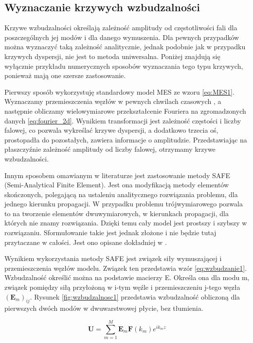 

\subsection{Wyznaczanie krzywych wzbudzalności}

Krzywe wzbudzalności określają zależność amplitudy od częstotliwości fali dla poszczególnych jej modów i dla danego wymuszenia. Dla pewnych przypadków można wyznaczyć taką zależność analitycznie, jednak podobnie jak w przypadku krzywych dyspersji, nie jest to metoda uniwersalna. Poniżej znajdują się wyłącznie przykładu numerycznych sposobów wyznaczania tego typu krzywych, ponieważ mają one szersze zastosowanie.

Pierwszy sposób wykorzystuję standardowy model MES ze wzoru \ref{eq:MES1}. Wyznaczamy przemieszczenia węzłów w pewnych chwilach czasowych , a następnie obliczamy wielowymiarowe przekształcenie Fouriera na zgromadzonych danych \ref{eq:fourier_2d}. Wynikiem transformacji jest zależność częstości i liczby falowej, co pozwala wykreślać krzywe dyspersji, a dodatkowo trzecia oś, prostopadła do pozostałych, zawiera informacje o amplitudzie. Przedstawiając na płaszczyźnie zależność amplitudy od liczby falowej, otrzymamy krzywe wzbudzalności.

\vspace{3mm}

Innym sposobem omawianym w literaturze jest zastosowanie metody SAFE (Semi-Analytical Finite Element). Jest ona modyfikacją metody elementów skończonych, polegającą na ustaleniu analitycznego rozwiązania problemu, dla jednego kierunku propagacji. W przypadku problemu trójwymiarowego pozwala to na tworzenie elementów dwuwymiarowych, w kierunkach propagacji, dla których nie znamy rozwiązania. Dzięki temu cały model jest prostszy i szybszy w rozwiązaniu. Sformułowanie takie jest jednak złożone i nie będzie tutaj przytaczane w całości. Jest ono opisane dokładniej w \cite{bartek_fabien}.

Wynikiem wykorzystania metody SAFE jest związek siły wymuszającej i przemieszczenia węzłów modelu. Związek ten przedstawia wzór \ref{eq:wzbudzanie1}. Wzbudzalność określić można na podstawie macierzy E. Określa ona dla modu m, związek pomiędzy siłą przyłożoną w i-tym węźle i przemieszczeniu j-tego węzła \( (\textbf{E}_m)_{ij} \). Rysunek \ref{fig:wzbudzalnosc1} przedstawia wzbudzalność obliczoną dla pierwszych dwóch modów w dwuwarstwowej płycie, bez tłumienia.

\begin{equation} \label{eq:wzbudzanie1}
\textbf{U} = \sum_{m=1}^M \textbf{E}_m \textbf{F}(k_m) e^{ik_m z}
\end{equation}

